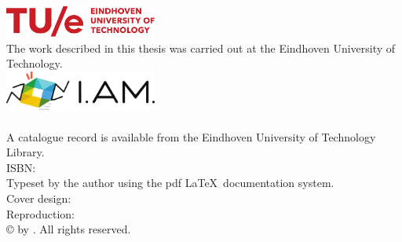 \thispagestyle{empty}
\vspace*{30mm}\noindent
\begin{center}
{\LARGE\sf\maintitle}\\[4.5cm] %
{\Large\sf \@author}
\end{center}

\newpage
\thispagestyle{empty}






\vspace*{\fill}
\noindent\includegraphics[width=5cm]{img/TUE-logo.pdf}\\
{The work described in this thesis was carried out at the Eindhoven University of
Technology.}\\[8mm]

\noindent\includegraphics[width=5cm]{img/ProjectLogo.pdf}\\[2mm]
\noindent\bgroup\project
\\[8mm]

\noindent\bgroup
A catalogue record is available from the Eindhoven University of Technology Library.\\
ISBN: \isbn\\[4mm]

\noindent Typeset by the author using the pdf \LaTeX \ documentation system.\\
Cover design: \designer \\
Reproduction: \printer\\[8mm]
\copyright\the\year{} by \@author. All rights reserved.
\egroup

\newpage
\thispagestyle{empty}





